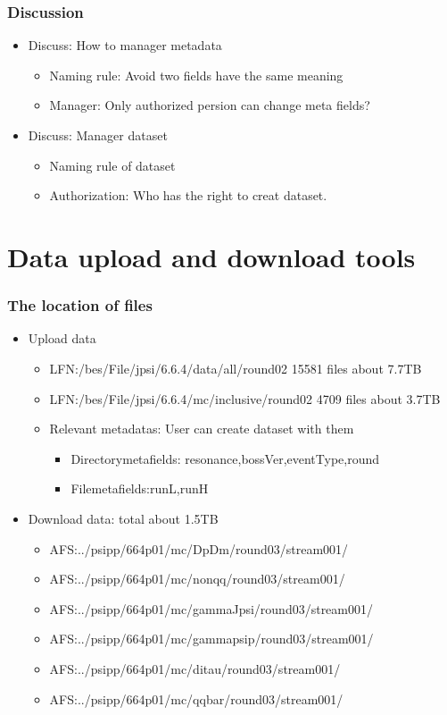 \documentclass{beamer}
\begin{document}
\begin{frame}
  \frametitle{Discussion}
  \begin{itemize}
    \item Discuss: How to manager metadata
      \begin{itemize}
        \item Naming rule: Avoid two fields have the same meaning
        \item Manager: Only authorized persion can change meta fields?
      \end{itemize}
    \item Discuss: Manager dataset
      \begin{itemize}
        \item Naming rule of dataset
        \item Authorization: Who has the right to creat dataset. 
      \end{itemize}
  \end{itemize}
\end{frame}

\section{Data upload and download tools}
\begin{frame}
  \frametitle{The location of files}
  \begin{itemize}
    \item Upload data
      \begin{itemize}
          \item LFN:/bes/File/jpsi/6.6.4/data/all/round02   15581 files   about 7.7TB
          \item LFN:/bes/File/jpsi/6.6.4/mc/inclusive/round02 4709 files  about 3.7TB
          \item Relevant metadatas: User can create dataset with them
            \begin{itemize}
              \item Directorymetafields: resonance,bossVer,eventType,round
              \item Filemetafields:runL,runH
            \end{itemize}
      \end{itemize}
    \item Download data: total about 1.5TB
      \begin{itemize}
          \item AFS:../psipp/664p01/mc/DpDm/round03/stream001/
          \item AFS:../psipp/664p01/mc/nonqq/round03/stream001/
          \item AFS:../psipp/664p01/mc/gammaJpsi/round03/stream001/
          \item AFS:../psipp/664p01/mc/gammapsip/round03/stream001/
          \item AFS:../psipp/664p01/mc/ditau/round03/stream001/
          \item AFS:../psipp/664p01/mc/qqbar/round03/stream001/
      \end{itemize}
  \end{itemize}
\end{frame}
\end{document}
